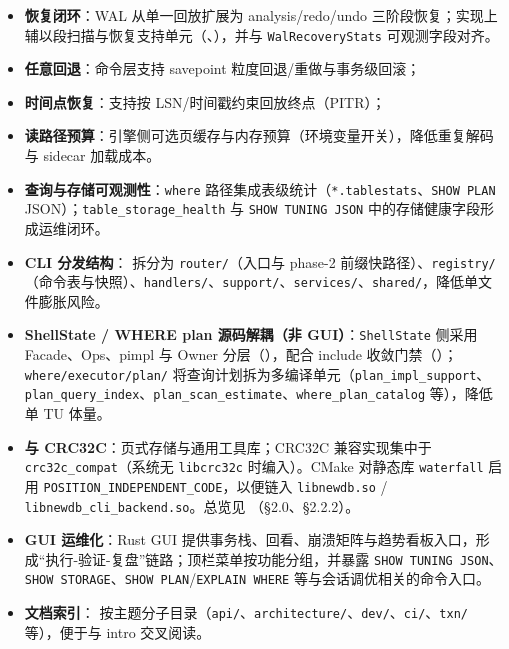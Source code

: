 \begin{itemize}
  \item \textbf{恢复闭环}：WAL 从单一回放扩展为 analysis/redo/undo 三阶段恢复；实现上辅以段扫描与恢复支持单元（、），并与 \texttt{WalRecoveryStats} 可观测字段对齐。
  \item \textbf{任意回退}：命令层支持 savepoint 粒度回退/重做与事务级回滚；
  \item \textbf{时间点恢复}：支持按 LSN/时间戳约束回放终点（PITR）；
  \item \textbf{读路径预算}：引擎侧可选页缓存与内存预算（环境变量开关），降低重复解码与 sidecar 加载成本。
  \item \textbf{查询与存储可观测性}：\texttt{where} 路径集成表级统计（\texttt{*.tablestats}、\texttt{SHOW PLAN} JSON）；\texttt{table\_storage\_health} 与 \texttt{SHOW TUNING JSON} 中的存储健康字段形成运维闭环。
  \item \textbf{CLI 分发结构}： 拆分为 \texttt{router/}（入口与 phase-2 前缀快路径）、\texttt{registry/}（命令表与快照）、\texttt{handlers/}、\texttt{support/}、\texttt{services/}、\texttt{shared/}，降低单文件膨胀风险。
  \item \textbf{ShellState / WHERE plan 源码解耦（非 GUI）}：\texttt{ShellState} 侧采用 Facade、Ops、pimpl 与 Owner 分层（），配合 include 收敛门禁（）；\texttt{where/executor/plan/} 将查询计划拆为多编译单元（\texttt{plan\_impl\_support}、\texttt{plan\_query\_index}、\texttt{plan\_scan\_estimate}、\texttt{where\_plan\_catalog} 等），降低单 TU 体量。
  \item \textbf{ 与 CRC32C}：页式存储与通用工具库；CRC32C 兼容实现集中于 \texttt{crc32c\_compat}（系统无 \texttt{libcrc32c} 时编入）。CMake 对静态库 \texttt{waterfall} 启用 \texttt{POSITION\_INDEPENDENT\_CODE}，以便链入 \texttt{libnewdb.so} / \texttt{libnewdb\_cli\_backend.so}。总览见 （§2.0、§2.2.2）。
  \item \textbf{GUI 运维化}：Rust GUI 提供事务栈、回看、崩溃矩阵与趋势看板入口，形成“执行-验证-复盘”链路；顶栏菜单按功能分组，并暴露 \texttt{SHOW TUNING JSON}、\texttt{SHOW STORAGE}、\texttt{SHOW PLAN}/\texttt{EXPLAIN WHERE} 等与会话调优相关的命令入口。
  \item \textbf{文档索引}： 按主题分子目录（\texttt{api/}、\texttt{architecture/}、\texttt{dev/}、\texttt{ci/}、\texttt{txn/} 等），便于与 intro 交叉阅读。
\end{itemize}


